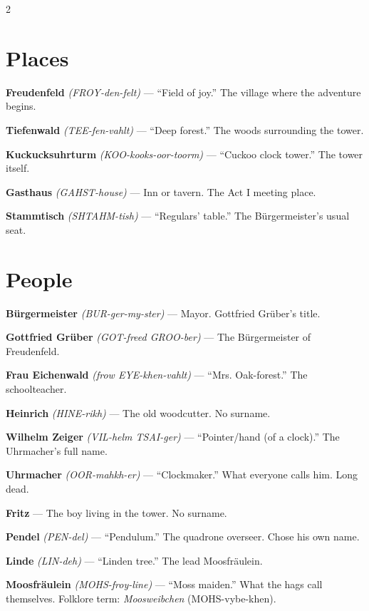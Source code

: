 \documentclass[10pt,letterpaper]{article}
\begin{document}
\begin{multicols}{2}

\section*{Places}

\textbf{Freudenfeld} \textit{(FROY-den-felt)} --- ``Field of joy.'' The village where the adventure begins.

\textbf{Tiefenwald} \textit{(TEE-fen-vahlt)} --- ``Deep forest.'' The woods surrounding the tower.

\textbf{Kuckucksuhrturm} \textit{(KOO-kooks-oor-toorm)} --- ``Cuckoo clock tower.'' The tower itself.

\textbf{Gasthaus} \textit{(GAHST-house)} --- Inn or tavern. The Act I meeting place.

\textbf{Stammtisch} \textit{(SHTAHM-tish)} --- ``Regulars' table.'' The Bürgermeister's usual seat.

\section*{People}

\textbf{Bürgermeister} \textit{(BUR-ger-my-ster)} --- Mayor. Gottfried Grüber's title.

\textbf{Gottfried Grüber} \textit{(GOT-freed GROO-ber)} --- The Bürgermeister of Freudenfeld.

\textbf{Frau Eichenwald} \textit{(frow EYE-khen-vahlt)} --- ``Mrs. Oak-forest.'' The schoolteacher.

\textbf{Heinrich} \textit{(HINE-rikh)} --- The old woodcutter. No surname.

\textbf{Wilhelm Zeiger} \textit{(VIL-helm TSAI-ger)} --- ``Pointer/hand (of a clock).'' The Uhrmacher's full name.

\textbf{Uhrmacher} \textit{(OOR-mahkh-er)} --- ``Clockmaker.'' What everyone calls him. Long dead.

\textbf{Fritz} --- The boy living in the tower. No surname.

\textbf{Pendel} \textit{(PEN-del)} --- ``Pendulum.'' The quadrone overseer. Chose his own name.

\textbf{Linde} \textit{(LIN-deh)} --- ``Linden tree.'' The lead Moosfräulein.

\textbf{Moosfräulein} \textit{(MOHS-froy-line)} --- ``Moss maiden.'' What the hags call themselves. Folklore term: \textit{Moosweibchen} (MOHS-vybe-khen).


\end{multicols}
\end{document}
